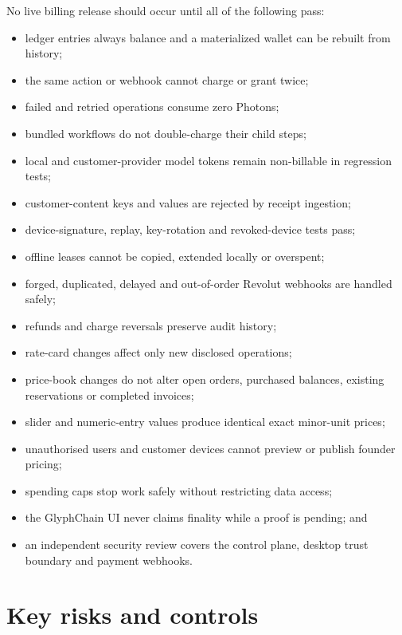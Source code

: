 \documentclass[11pt]{article}
\begin{document}
No live billing release should occur until all of the following pass:

\begin{itemize}
  \item ledger entries always balance and a materialized wallet can be rebuilt from history;
  \item the same action or webhook cannot charge or grant twice;
  \item failed and retried operations consume zero Photons;
  \item bundled workflows do not double-charge their child steps;
  \item local and customer-provider model tokens remain non-billable in regression tests;
  \item customer-content keys and values are rejected by receipt ingestion;
  \item device-signature, replay, key-rotation and revoked-device tests pass;
  \item offline leases cannot be copied, extended locally or overspent;
  \item forged, duplicated, delayed and out-of-order Revolut webhooks are handled safely;
  \item refunds and charge reversals preserve audit history;
  \item rate-card changes affect only new disclosed operations;
  \item price-book changes do not alter open orders, purchased balances, existing reservations or completed invoices;
  \item slider and numeric-entry values produce identical exact minor-unit prices;
  \item unauthorised users and customer devices cannot preview or publish founder pricing;
  \item spending caps stop work safely without restricting data access;
  \item the GlyphChain UI never claims finality while a proof is pending; and
  \item an independent security review covers the control plane, desktop trust boundary and payment webhooks.
\end{itemize}

\section{Key risks and controls}
\end{document}
